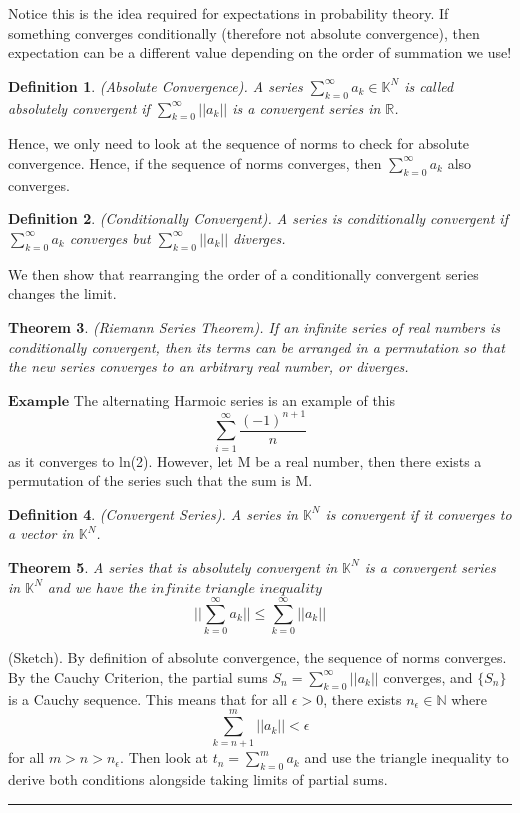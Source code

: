 \documentclass[twoside]{article}
\newcounter{lecnum}
\newtheorem{theorem}{Theorem}[lecnum]
\newtheorem{definition}[theorem]{Definition}
\newenvironment{proof}{{\bf Proof:}}{\hfill\rule{2mm}{2mm}}
\begin{document}
Notice this is the idea required for expectations in probability theory. If something converges conditionally (therefore not absolute convergence), then expectation can be a different value depending on the order of summation we use!


\begin{definition}
(Absolute Convergence). A series $\sum_{k=0}^{\infty}a_k \in \mathbb{K}^N$ is called absolutely convergent if $\sum_{k=0}^{\infty}||a_k||$ is a convergent series in $\mathbb{R}$.
\end{definition}
        
Hence, we only need to look at the sequence of norms to check for absolute convergence. Hence, if the sequence of norms converges, then $\sum_{k=0}^{\infty}a_k$ also converges. 

\begin{definition}
(Conditionally Convergent). A series is conditionally convergent if $\sum_{k=0}^{\infty}a_k$ converges but $\sum_{k=0}^{\infty}||a_k||$ diverges.
\end{definition}

We then show that rearranging the order of a conditionally convergent series changes the limit.

\begin{theorem}(Riemann Series Theorem). If an infinite series of real numbers is conditionally convergent, then its terms can be arranged in a permutation so that the new series converges to an arbitrary real number, or diverges.
\end{theorem}

\bigskip
$\textbf{Example}$ The alternating Harmoic series is an example of this
$$
\sum_{i=1}^{\infty}\frac{(-1)^{n+1}}{n}
$$
as it converges to ln(2). However, let M be a real number, then there exists a permutation of the series such that the sum is M.


\begin{definition}(Convergent Series). A series in $\mathbb{K}^N$ is convergent if it converges to a vector in $\mathbb{K}^N$.
\end{definition}

\begin{theorem}
A series that is absolutely convergent in $\mathbb{K}^N$ is a convergent series in $\mathbb{K}^N$ and we have the $\textit{infinite triangle inequality}$
$$
||\sum_{k=0}^{\infty}a_k|| \leq \sum_{k=0}^{\infty}||a_k|| 
$$
\end{theorem}
\begin{proof}(Sketch). By definition of absolute convergence, the sequence of norms converges. By the Cauchy Criterion, the partial sums $S_n = \sum_{k=0}^{\infty}||a_k||$ converges, and $\{S_n\}$ is a Cauchy sequence. This means that for all $\epsilon > 0$, there exists $n_{\epsilon} \in \mathbb{N}$ where 
$$
\sum_{k=n+1}^{m}||a_k|| < \epsilon
$$
for all $m > n > n_{\epsilon}$. Then look at $t_n = \sum_{k=0}^ma_k$ and use the triangle inequality to derive both conditions alongside taking limits of partial sums.
\end{proof}
\end{document}
